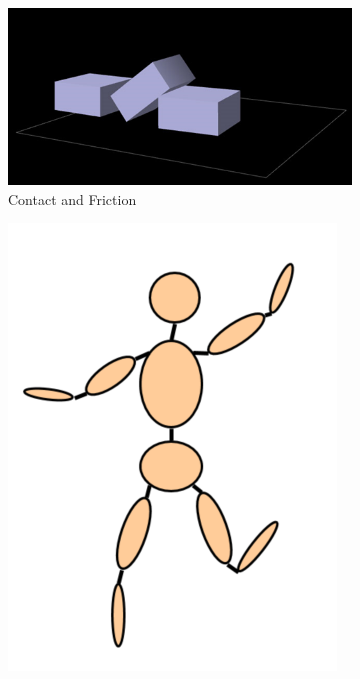 \begin{figure}[h]
    \begin{subfigure}[b]{0.3\linewidth}
    \includegraphics[width=\linewidth]{./resources/physics/contactFric.png}
    \caption{Contact and Friction}
    \end{subfigure}
    \begin{subfigure}[b]{0.3\linewidth}
    \includegraphics[width=\linewidth]{./resources/physics/Ragdoll.png}

\end{subfigure}
\end{figure}
